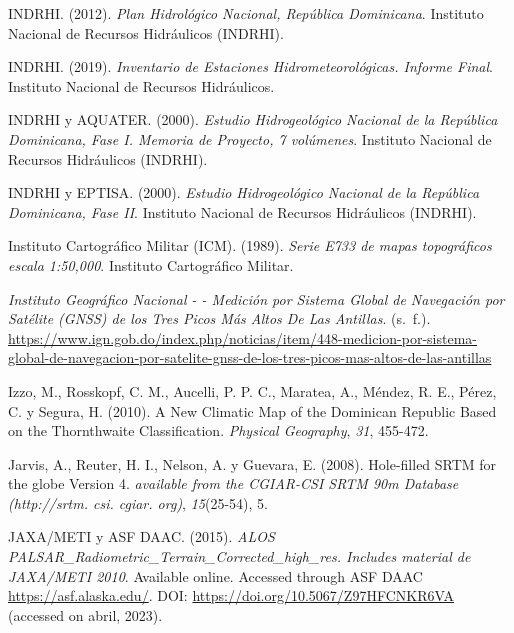 \documentclass[spanish]{article}
\newlength{\cslhangindent}
\newlength{\cslentryspacingunit} %
\newenvironment{CSLReferences}[2] %
 {%
  \setlength{\parindent}{0pt}
  \ifodd #1
  \let\oldpar\par
  \def\par{\hangindent=\cslhangindent\oldpar}
  \fi
  \setlength{\parskip}{#2\cslentryspacingunit}
 }%
 {}
\begin{document}
\begin{CSLReferences}{1}{0}
\leavevmode{}%
INDRHI. (2012). \emph{{Plan Hidrológico Nacional, República
Dominicana}}. {Instituto Nacional de Recursos Hidráulicos (INDRHI)}.

\leavevmode{}%
INDRHI. (2019). \emph{{Inventario de Estaciones Hidrometeorológicas.
Informe Final}}. {Instituto Nacional de Recursos Hidráulicos}.

\leavevmode{}%
INDRHI y AQUATER. (2000). \emph{{Estudio Hidrogeológico Nacional de la
República Dominicana, Fase I. Memoria de Proyecto, 7 volúmenes}}.
{Instituto Nacional de Recursos Hidráulicos (INDRHI)}.

\leavevmode{}%
INDRHI y EPTISA. (2000). \emph{{Estudio Hidrogeológico Nacional de la
República Dominicana, Fase II}}. {Instituto Nacional de Recursos
Hidráulicos (INDRHI)}.

\leavevmode{}%
Instituto Cartográfico Militar (ICM). (1989). \emph{{Serie E733 de mapas
topográficos escala 1:50,000}}. {Instituto Cartográfico Militar}.

\leavevmode{}%
\emph{Instituto Geográfico Nacional - - Medición por Sistema Global de
Navegación por Satélite (GNSS) de los Tres Picos Más Altos De Las
Antillas}. (s.~f.).
\url{https://www.ign.gob.do/index.php/noticias/item/448-medicion-por-sistema-global-de-navegacion-por-satelite-gnss-de-los-tres-picos-mas-altos-de-las-antillas}

\leavevmode{}%
Izzo, M., Rosskopf, C. M., Aucelli, P. P. C., Maratea, A., Méndez, R.
E., Pérez, C. y Segura, H. (2010). A New Climatic Map of the Dominican
Republic Based on the Thornthwaite Classification. \emph{Physical
Geography}, \emph{31}, 455-472.

\leavevmode{}%
Jarvis, A., Reuter, H. I., Nelson, A. y Guevara, E. (2008). Hole-filled
SRTM for the globe Version 4. \emph{available from the CGIAR-CSI SRTM
90m Database (http://srtm. csi. cgiar. org)}, \emph{15}(25-54), 5.

\leavevmode{}%
JAXA/METI y ASF DAAC. (2015). \emph{{ALOS
PALSAR\_Radiometric\_Terrain\_Corrected\_high\_res. Includes material de
JAXA/METI 2010}}. Available online. Accessed through ASF DAAC
\url{https://asf.alaska.edu/}. DOI:
\url{https://doi.org/10.5067/Z97HFCNKR6VA} (accessed on abril, 2023).


\end{CSLReferences}
\end{document}
